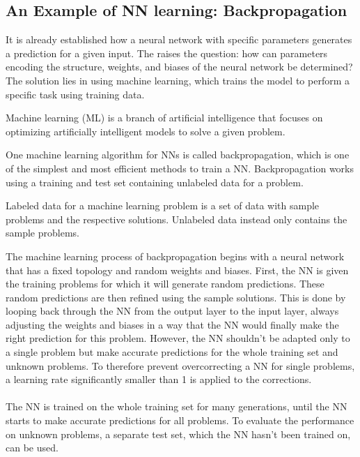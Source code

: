 \documentclass[11pt]{report}
\newcommand{\mydeflabel}{}
\newenvironment{mydef}[1]
{\renewcommand\mydeflabel{#1}\begin{mydefinner}}
{\end{mydefinner}}
\begin{document}
    \subsection{An Example of NN learning: Backpropagation}\label{subsec:an-example-of-nn-learning:-backpropagation}
    It is already established how a neural network with specific parameters generates a prediction for a given input.
    The raises the question: how can parameters encoding the structure, weights, and biases of the neural network be determined?
    The solution lies in using machine learning, which trains the model to perform a specific task using training data.
    \begin{mydef}{Machine Learning}
        Machine learning (ML) is a branch of artificial intelligence that focuses on optimizing artificially intelligent models to solve a given problem.
    \end{mydef}
    One machine learning algorithm for NNs is called backpropagation, which is one of the simplest and most efficient methods to train a NN.\@
    Backpropagation works using a training and test set containing unlabeled data for a problem.
    \begin{mydef}{(Un)labeled Data}
        Labeled data for a machine learning problem is a set of data with sample problems and the respective solutions.
        Unlabeled data instead only contains the sample problems.
    \end{mydef}
    The machine learning process of backpropagation begins with a neural network that has a fixed topology and random weights and biases.
    First, the NN is given the training problems for which it will generate random predictions.
    These random predictions are then refined using the sample solutions.
    This is done by looping back through the NN from the output layer to the input layer, always adjusting the weights and biases in a way that the NN would finally make the right prediction for this problem.
    However, the NN shouldn't be adapted only to a single problem but make accurate predictions for the whole training set and unknown problems.
    To therefore prevent overcorrecting a NN for single problems, a learning rate significantly smaller than 1 is applied to the corrections.
    \\ \\
    The NN is trained on the whole training set for many generations, until the NN starts to make accurate predictions for all problems.
    To evaluate the performance on unknown problems, a separate test set, which the NN hasn't been trained on, can be used.
\end{document}
